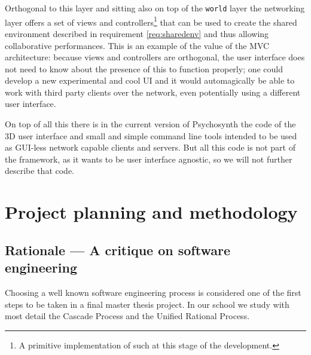 Orthogonal to this layer and sitting also on top of the \texttt{world}
layer the networking layer offers a set of views and
controllers\footnote{A primitive implementation of such at this stage
  of the development.}  that can be used to create the shared
environment described in requirement \ref{req:sharedenv} and thus
allowing collaborative performances. This is an example of the value
of the MVC architecture: because views and controllers are orthogonal,
the user interface does not need to know about the presence of this to
function properly; one could develop a new experimental and cool UI
and it would automagically be able to work with third party clients
over the network, even potentially using a different user interface.

On top of all this there is in the current version of Psychosynth the
code of the 3D user interface and small and simple command line tools
intended to be used as GUI-less network capable clients and
servers. But all this code is not part of the framework, as it wants
to be user interface agnostic, so we will not further describe that
code.

\section{Project planning and methodology}

\subsection{Rationale --- A critique on software engineering}


Choosing a well known software engineering process is considered one
of the first steps to be taken in a final master thesis project. In
our school we study with most detail the Cascade Process and the
Unified Rational Process.


